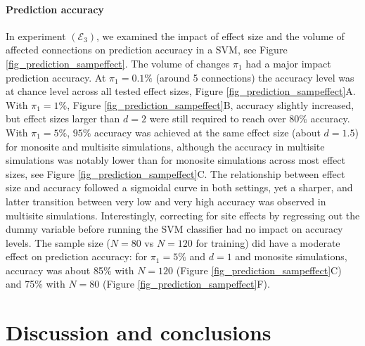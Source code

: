 \documentclass[authoryear]{elsarticle}
\begin{document}
\paragraph{Prediction accuracy}
In experiment $(\mathcal{E}_3)$, we examined the impact of effect size and the volume of affected connections on prediction accuracy in a SVM, see Figure \ref{fig_prediction_sampeffect}. The volume of changes $\pi_1$ had a major impact prediction accuracy. At $\pi_1=0.1\%$ (around 5 connections) the accuracy level was at chance level across all tested effect sizes, Figure \ref{fig_prediction_sampeffect}A. With $\pi_1=1\%$, Figure \ref{fig_prediction_sampeffect}B, accuracy slightly increased, but effect sizes larger than $d=2$ were still required to reach over $80\%$ accuracy. With $\pi_1=5\%$, $95\%$ accuracy was achieved at the same effect size (about $d=1.5$) for monosite and multisite simulations, although the accuracy in multisite simulations was notably lower than for monosite simulations across most effect sizes, see Figure \ref{fig_prediction_sampeffect}C. The relationship between effect size and accuracy followed a sigmoidal curve in both settings, yet a sharper, and latter transition between very low and very high accuracy was observed in multisite simulations. Interestingly, correcting for site effects by regressing out the dummy variable before running the SVM classifier had no impact on accuracy levels. The sample size ($N=80$ vs $N=120$ for training) did have a moderate effect on prediction accuracy: for $\pi_1=5\%$ and $d=1$ and monosite simulations, accuracy was about 85\% with $N=120$ (Figure \ref{fig_prediction_sampeffect}C) and 75\% with $N=80$ (Figure \ref{fig_prediction_sampeffect}F).


\section{Discussion and conclusions}

\end{document}
